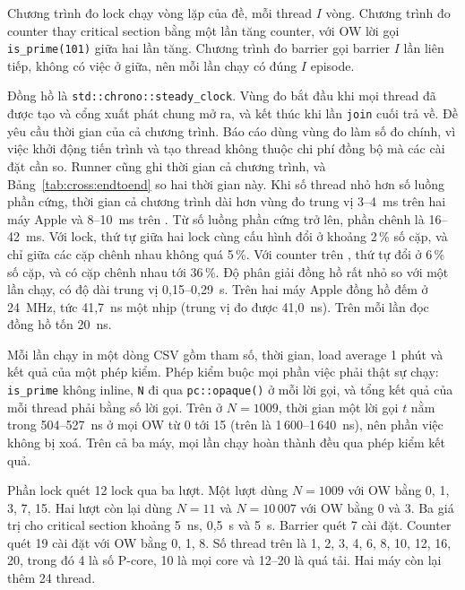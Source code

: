 Chương trình đo lock chạy vòng lặp của đề, mỗi thread $I$ vòng. Chương trình đo counter thay critical
section bằng một lần tăng counter, với OW lời gọi \texttt{is\_prime(101)} giữa hai lần tăng. Chương trình
đo barrier gọi barrier $I$ lần liên tiếp, không có việc ở giữa, nên mỗi lần chạy có đúng $I$ episode.

Đồng hồ là \texttt{std::chrono::steady\_clock}. Vùng đo bắt đầu khi mọi thread đã được tạo và cổng
xuất phát chung mở ra, và kết thúc khi lần \texttt{join} cuối trả về. Đề yêu cầu thời gian của cả
chương trình. Báo cáo dùng vùng đo làm số đo chính, vì việc khởi động tiến trình và tạo thread không
thuộc chi phí đồng bộ mà các cài đặt cần so. Runner cũng ghi thời gian cả chương trình, và
Bảng~\ref{tab:cross:endtoend} so hai thời gian này. Khi số thread nhỏ hơn số luồng phần cứng, thời gian
cả chương trình dài hơn vùng đo trung vị 3--4~ms trên hai máy Apple và 8--10~ms trên .
Từ số luồng phần cứng trở lên, phần chênh là 16--42~ms. Với lock, thứ tự giữa hai lock cùng cấu hình đổi
ở khoảng 2\,\% số cặp, và chỉ giữa các cặp chênh nhau không quá 5\,\%. Với counter trên
, thứ tự đổi ở 6\,\% số cặp, và có cặp chênh nhau tới 36\,\%. Độ phân giải đồng hồ
rất nhỏ so với một lần chạy, có độ dài trung vị 0,15--0,29~s. Trên hai máy Apple đồng hồ đếm ở 24~MHz,
tức 41,7~ns một nhịp (trung vị đo được 41,0~ns). Trên  mỗi lần đọc đồng hồ tốn 20~ns.

Mỗi lần chạy in một dòng CSV gồm tham số, thời gian, load average 1 phút và kết quả của một phép kiểm.
Phép kiểm buộc mọi phần việc phải thật sự chạy: \texttt{is\_prime} không inline, \texttt{N} đi qua
\texttt{pc::opaque()} ở mỗi lời gọi, và tổng kết quả của mỗi thread phải bằng số lời gọi. Trên
 ở $N=1009$, thời gian một lời gọi $t$ nằm trong 504--527~ns ở mọi OW từ 0 tới 15 (trên
 là 1\,600--1\,640~ns), nên phần việc không bị xoá. Trên
cả ba máy, mọi lần chạy hoàn thành đều qua phép kiểm kết quả.

Phần lock quét 12 lock qua ba lượt. Một lượt dùng $N=1009$ với OW bằng 0, 1, 3, 7, 15. Hai lượt còn lại
dùng $N=11$ và $N=10\,007$ với OW bằng 0 và 3. Ba giá trị cho critical section khoảng 5~ns, 0,5~\textmu s
và 5~\textmu s. Barrier quét 7 cài đặt. Counter quét 19 cài đặt với OW bằng 0, 1, 8. Số thread trên
 là 1, 2, 3, 4, 6, 8, 10, 12, 16, 20, trong đó 4 là số P-core, 10 là mọi core và 12--20
là quá tải. Hai máy còn lại thêm 24 thread.

